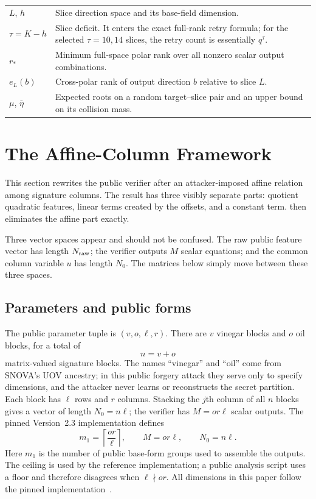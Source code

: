 \documentclass[11pt]{article}
\begin{document}
\begin{table}[H]
\begin{tabularx}{0.96\textwidth}{@{}>{\raggedright\arraybackslash}p{}X@{}}
$L$, $h$ & Slice direction space and its base-field dimension.\\
$\tau=K-h$ & Slice deficit.  It enters the exact full-rank retry formula;
for the selected $\tau=10,14$ slices, the retry count is essentially $q^\tau$.\\
$r_*$ & Minimum full-space polar rank over all nonzero scalar output
combinations.\\
$e_L(b)$ & Cross-polar rank of output direction $b$ relative to slice $L$.\\
$\mu$, $\bar\eta$ & Expected roots on a random target--slice pair and an upper
bound on its collision mass.\\
\bottomrule
\end{tabularx}
\end{table}

\section{The Affine-Column Framework}\label{sec:prelim}

This section rewrites the public verifier after an attacker-imposed affine
relation among signature columns.  The result has three visibly separate
parts: quotient quadratic features, linear terms created by the offsets, and a
constant term.   then eliminates the affine part
exactly.

Three vector spaces appear and should not be confused.  The raw public feature
vector has length $N_{\rm raw}$; the verifier outputs $M$ scalar equations; and the
common column variable $u$ has length $N_0$.  The matrices below simply move
between these three spaces.

\subsection{Parameters and public forms}\label{sec:parameters}

The public parameter tuple is $(v,o,\ell,r)$.  There are $v$ vinegar blocks and
$o$ oil blocks, for a total of
\[
  n=v+o
\]
matrix-valued signature blocks.  The names ``vinegar'' and ``oil'' come from
SNOVA's UOV ancestry; in this public forgery attack they serve only to specify
dimensions, and the attacker never learns or reconstructs the secret partition.
Each block has $\ell$ rows and $r$ columns.
Stacking the $j$th column of all $n$ blocks gives a vector of length
$N_0=n\ell$; the verifier has $M=or\ell$ scalar outputs.  The pinned
Version~2.3 implementation defines
\begin{equation}\label{eq:parameters-basic}
 m_1=\left\lceil\frac{or}{\ell}\right\rceil,
 \qquad M=or\ell,
 \qquad N_0=n\ell.
\end{equation}
Here $m_1$ is the number of public base-form groups used to assemble the
outputs.  The ceiling is used by the reference implementation; a public
analysis script uses a floor and therefore disagrees when $\ell\nmid or$.  All
dimensions in this paper follow the pinned implementation~\cite{SNOVA23}.
\end{document}

